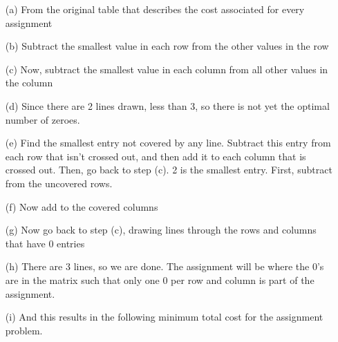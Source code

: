 \begin{enumerate}
  \item[(a)] From the original table that describes the cost associated for every assignment
  \item[(b)] Subtract the smallest value in each row from the other values in the row
  \item[(c)] Now, subtract the smallest value in each column from all other values in the column
  \item[(d)] Since there are 2 lines drawn, less than 3, so there is not yet the optimal number of zeroes. 
  \item[(e)] Find the smallest entry not covered by any line. Subtract this entry from each row that isn’t crossed out, and then add it to each column that is crossed out. 
              Then, go back to step (c). 2 is the smallest entry. First, subtract from the uncovered rows.
  \item[(f)] Now add to the covered columns
  \item[(g)] Now go back to step (c), drawing lines through the rows and columns that have 0 entries 
  \item[(h)] There are 3 lines, so we are done. The assignment will be where the 0's are in the matrix such that only one 0 per row and column is part of the assignment.
  \item[(i)] And this results in the following minimum total cost for the assignment problem. 
\end{enumerate}

